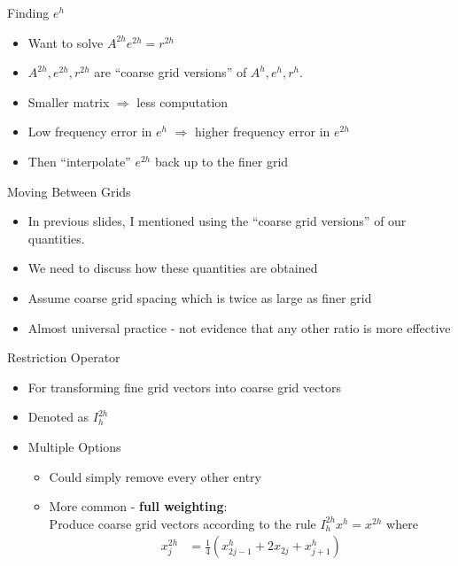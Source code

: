 \documentclass[11pt]{beamer}
\begin{document}
\begin{frame}{Finding $e^h$}
  \begin{itemize}
  \item Want to solve $A^{2h}e^{2h} = r^{2h}$
  \item $A^{2h}, e^{2h}, r^{2h}$ are ``coarse grid versions'' of $A^h, e^h, r^h$.
  \item Smaller matrix $\Rightarrow$ less computation
  \item Low frequency error in $e^h$ $\Rightarrow$ higher frequency error in $e^{2h}$
  \item Then ``interpolate'' $e^{2h}$ back up to the finer grid
  \end{itemize}
\end{frame}
\begin{frame}{Moving Between Grids}
  \begin{itemize}
  \item In previous slides, I mentioned using the ``coarse grid versions'' of our
    quantities.
  \item We need to discuss how these quantities are obtained
  \item Assume coarse grid spacing which is twice as large as finer grid
  \item Almost universal practice - not evidence that any other ratio is more effective
  \end{itemize}
\end{frame}
\begin{frame}{Restriction Operator}
  \begin{itemize}
  \item For transforming fine grid vectors into coarse grid vectors 
  \item Denoted as $I_h^{2h}$
  \item Multiple Options
    \begin{itemize}
    \item Could simply remove every other entry
    \item More common - \textbf{full weighting}:\\
      Produce coarse grid vectors according to the rule \(I_{h}^{2h} x^{h} =
      x^{2h}\) where
      \begin{align*}
        x_{j}^{2h} &= \frac{1}{4} \left( x_{2j-1}^{h} + 2x_{2j} + x_{j+1}^{h} \right)
      \end{align*}
    \end{itemize}
  \end{itemize}
\end{frame}
\end{document}
